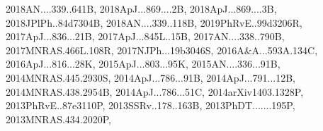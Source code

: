 \documentclass[12pt]{article}
\begin{document}
\begin{enumerate}
\begin{enumerate}
{2018AN....339..641B,%
2018ApJ...869....2B,%
2018ApJ...869....3B,%
2018JPlPh..84d7304B,%
2018AN....339..118B,%
2019PhRvE..99d3206R,%
2017ApJ...836...21B,%
2017ApJ...845L..15B,%
2017AN....338..790B,%
2017MNRAS.466L.108R,%
2017NJPh...19b3046S,%
2016A&A...593A.134C,%
2016ApJ...816...28K,%
2015ApJ...803...95K,%
2015AN....336...91B,%
2014MNRAS.445.2930S,%
2014ApJ...786...91B,%
2014ApJ...791...12B,%
2014MNRAS.438.2954B,%
2014ApJ...786...51C,%
2014arXiv1403.1328P,%
2013PhRvE..87e3110P,%
2013SSRv..178..163B,%
2013PhDT.......195P,%
2013MNRAS.434.2020P,%
}
\end{enumerate}
\end{enumerate}
\end{document}
